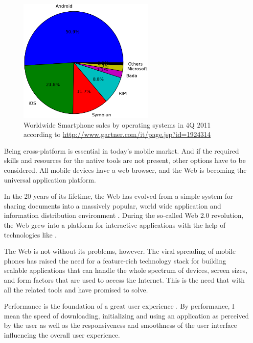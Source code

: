 \begin{figure}[ht]
  \begin{center}
    \includegraphics[width=0.6\textwidth]{images/market-share.png}
    \caption{Worldwide Smartphone sales by operating systems in 4Q
      2011 according to
      \url{http://www.gartner.com/it/page.jsp?id=1924314}}
    \label{figure:market-share.png}
  \end{center}
\end{figure}

Being cross-platform is essential in today's mobile market. And if the
required skills and resources for the native tools are not present,
other options have to be considered. All mobile devices have a web
browser, and the Web is becoming the universal application
platform. \cite{taivalsaari2011web, mikkonen2011apps}

In the 20 years of its lifetime, the Web has evolved from a simple
system for sharing documents into a massively popular, world wide
application and information distribution environment
\cite{taivalsaari2011web}. During the so-called Web 2.0 revolution,
the Web grew into a platform for interactive applications with the
help of technologies like  \cite{garrett2005ajax}.

The Web is not without its problems, however. The viral spreading of
mobile phones has raised the need for a feature-rich technology stack
for building scalable applications that can handle the whole spectrum
of devices, screen sizes, and form factors that are used to access the
Internet. This is the need that  with all the related
tools and  have promised to solve.

Performance is the foundation of a great user experience
\cite{charland2011mobile}. By performance, I mean the speed of
downloading, initializing and using an application as perceived by the
user as well as the responsiveness and smoothness of the user
interface influencing the overall user experience.

